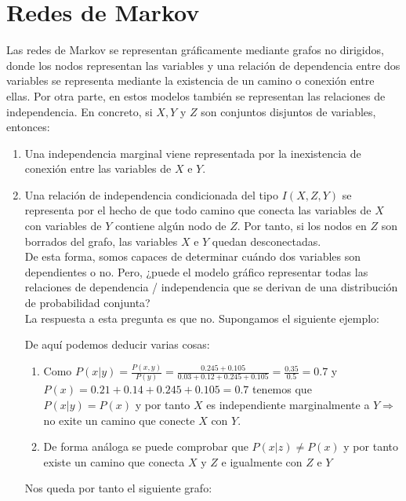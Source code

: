 \documentclass{article}
\theoremstyle{definition_wo_parentheses}
\begin{document}
\section{Redes de Markov}
Las redes de Markov se representan gráficamente mediante grafos no dirigidos, donde los nodos representan las variables y una relación de dependencia entre dos variables se representa mediante la existencia de un camino o conexión entre ellas. Por otra parte, en estos modelos también se representan las relaciones de independencia. En concreto, si $X,Y$ y $Z$ son conjuntos disjuntos de variables, entonces:
\begin{enumerate}
\item Una independencia marginal viene representada por la inexistencia de conexión entre las variables de $X$ e $Y$.
\item Una relación de independencia condicionada del tipo $I(X,Z,Y)$ se representa por el hecho de que todo camino que conecta las variables de $X$ con variables de $Y$ contiene algún nodo de $Z$. Por tanto, si los nodos en $Z$ son borrados del grafo, las variables $X$ e $Y$ quedan desconectadas.\\
De esta forma, somos capaces de determinar cuándo dos variables son dependientes o no. Pero, ¿puede el modelo gráfico representar todas las relaciones de dependencia / independencia que se derivan de una distribución de probabilidad conjunta?\\
La respuesta a esta pregunta es que no. Supongamos el siguiente ejemplo:

De aquí podemos deducir varias cosas:
\begin{enumerate}
\item Como $P(x|y)=\frac{P(x,y)}{P(y)} = \frac{0.245+0.105}{0.03+0.12+0.245+0.105} = \frac{0.35}{0.5} = 0.7$ y $P(x)=0.21+0.14+0.245+0.105 = 0.7$ tenemos que $P(x|y)=P(x)$ y por tanto $X$ es independiente marginalmente a $Y \Rightarrow$ no exite un camino que conecte $X$ con $Y$.
\item De forma análoga se puede comprobar que $P(x|z)\neq P(x)$ y por tanto existe un camino que conecta $X$ y $Z$ e igualmente con $Z$ e $Y$
\end{enumerate}

Nos queda por tanto el siguiente grafo:
\begin{center}
\end{center}
\end{enumerate}
\end{document}
